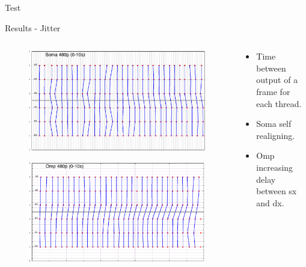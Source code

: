 \documentclass[xcolor=dvipsnames]{beamer}
\begin{document}
\begin{section}{Test}
\begin{frame}{\hskip 0.3cm Results - Jitter}
\begin{columns}
\begin{column}{6.5cm}
\begin{figure}
\includegraphics[scale=0.13]{soma_480_range_010.png}
\end{figure}

\vskip -0.5cm
\begin{figure}

\includegraphics[scale=0.13]{omp_480_range_010.png}
\end{figure}

\end{column}

\begin{column}{5cm}

\begin{itemize}

\item Time between output of a frame for each thread.

\item Soma self realigning.

\item Omp increasing delay between sx and dx.

\end{itemize}


\end{column}
\end{columns}
\end{frame}
\end{section}
\end{document}

